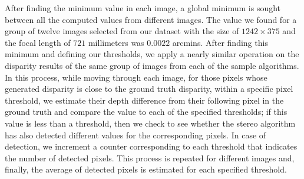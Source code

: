 After finding the minimum value in each image, a global minimum is sought between all the computed values from different images.
The value we found for a group of twelve images selected from our dataset with the size of $1242\times375$ and the focal length of $721$ 
millimeters was $0.0022$ arcmins.
After finding this minimum and defining our thresholds, we apply a nearly similar operation on the disparity results of the same group of images 
from each of the sample algorithms.
In this process, while moving through each image, for those pixels whose generated disparity is close to the ground truth disparity, 
within a specific pixel threshold, 
we estimate their depth difference from their following pixel
in the ground truth and compare the value to each of the specified thresholds; if this value is less than a threshold, then we check to see whether
the stereo algorithm has also detected different values for the corresponding pixels. 
In case of detection, we increment a counter corresponding to each threshold that indicates the number of detected pixels.
This process is repeated for different images and, finally, the average of detected pixels is estimated for each specified threshold.

